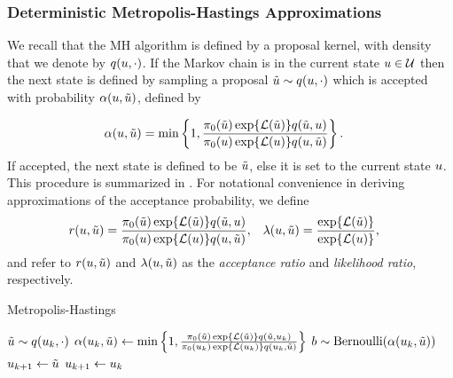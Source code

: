 \documentclass[12pt]{article}
\begin{document}
\subsubsection{Deterministic Metropolis-Hastings Approximations}
We recall that the MH algorithm is defined by a proposal kernel, with density that we denote by 
$\propDens(\Par, \cdot)$. If the Markov chain is in the current state $\Par \in \parSpace$ then 
the next state is defined by sampling a proposal $\propPar \sim \propDens(\Par, \cdot)$ which is 
accepted with probability $\accProbMH(\Par, \propPar)$, defined by 

\begin{align}
&\accProbMH(\Par, \propPar) = 
\min\left\{1, \frac{\priorDens(\propPar) \Exp{\llik(\propPar)} \propDens(\propPar, \Par)}{\priorDens(\Par) \Exp{\llik(\Par)} \propDens(\Par, \propPar)} \right\}.
\label{MH_acc_prob_exact}
\end{align}
If accepted, the next state is defined to be $\propPar$, else it is set to the current state $\Par$. 
This procedure is summarized in . For notational convenience in deriving approximations 
of the acceptance probability, we define 
\begin{align}
&\accProbRatio(\Par, \propPar) 
= \frac{\priorDens(\propPar) \Exp{\llik(\propPar)} \propDens(\propPar, \Par)}{\priorDens(\Par) \Exp{\llik(\Par)} \propDens(\Par, \propPar)}, 
&&\likRatio(\Par, \propPar) = \frac{\Exp{\llik(\propPar)}}{\Exp{\llik(\Par)}},
\label{MH_acc_prob_exact}
\end{align}
and refer to $\accProbRatio(\Par, \propPar)$ and $\likRatio(\Par, \propPar)$ 
as the \textit{acceptance ratio} and \textit{likelihood ratio}, respectively.

\begin{algorithm}
    \caption{Metropolis-Hastings}
    \label{alg:MH}
    \begin{algorithmic}[1] %
        		\State $\propPar \sim \propDens(\indexMCMC{\Par}, \cdot)$ 
		\State $\accProbMH(\indexMCMC{\Par}, \propPar) \gets \min\left\{1, \frac{\priorDens(\propPar)\Exp{\llik(\propPar)}
				\propDens(\propPar, \indexMCMC{\Par})}{\priorDens(\indexMCMC{\Par}) \Exp{\llik(\indexMCMC{\Par})}  \propDens(\indexMCMC{\Par}, \propPar)} \right\}$
		\State $b \sim \text{Bernoulli}(\accProbMH(\indexMCMC{\Par}, \propPar))$
			\State $\indexMCMC[\mcmcIndex+1]{\Par} \gets \propPar$ 
		\Else
			\State $\indexMCMC[\mcmcIndex+1]{\Par} \gets \indexMCMC{\Par}$
		\EndIf
	\EndFor
	\EndFunction
    \end{algorithmic}
\end{algorithm}
\end{document}
